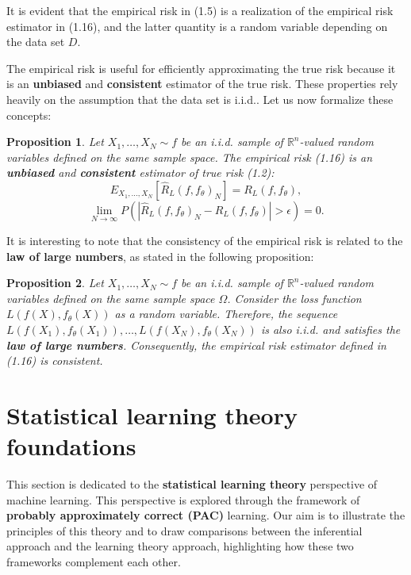 \documentclass{report}
\newtheorem{proposition}{Proposition}[chapter]
\begin{document}
It is evident that the empirical risk in (1.5) is a realization of the empirical risk estimator in (1.16), and the latter quantity is a random variable depending on the data set $D$.

The empirical risk is useful for efficiently approximating the true risk because it is an \textbf{unbiased} and \textbf{consistent} estimator of the true risk. These properties rely heavily on the assumption that the data set is i.i.d.. Let us now formalize these concepts:

\begin{proposition}
Let $X_1,\dots,X_N \sim f$ be an i.i.d. sample of $\mathbb{R}^n$-valued random variables defined on the same sample space. The empirical risk (1.16) is an \textbf{unbiased} and \textbf{consistent} estimator of true risk (1.2):
\begin{equation}
 E_{X_1,...,X_N}[\hat{R}_L(f,f_\theta)_N] = R_L(f,f_\theta),
\end{equation}
\begin{equation}
 \lim_{N\to \infty}P(|\hat{R}_L(f,f_\theta)_N-R_L(f,f_\theta)| > \epsilon) = 0.
 \end{equation}
\end{proposition}

It is interesting to note that the consistency of the empirical risk is related to the \textbf{law of large numbers}, as stated in the following proposition:
\begin{proposition}
Let $X_1,\dots,X_N \sim f$ be an i.i.d. sample of $\mathbb{R}^n$-valued random variables defined on the same sample space $\Omega$. Consider the loss function $L(f(X), f_\theta(X))$ as a random variable. Therefore, the sequence $L(f(X_1),f_\theta(X_1)),\dots,L(f(X_N),f_\theta(X_N))$ is also i.i.d. and satisfies the \textbf{law of large numbers}. Consequently, the empirical risk estimator defined in (1.16) is consistent.
\end{proposition}

\section{Statistical learning theory foundations} 
This section is dedicated to the \textbf{statistical learning theory} perspective of machine learning. This perspective is explored through the framework of \textbf{probably approximately correct (PAC)} learning. Our aim is to illustrate the principles of this theory and to draw comparisons between the inferential approach and the learning theory approach, highlighting how these two frameworks complement each other.
\end{document}
